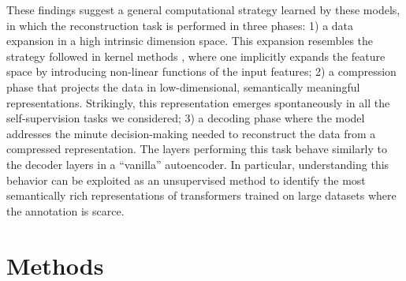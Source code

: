 \documentclass{article}
\begin{document}
These findings suggest a general computational strategy learned by these models, in which the reconstruction task is performed in three phases: 1) a data expansion in a high intrinsic dimension space. This expansion resembles the strategy followed in kernel methods \cite{scholkopf2018learning}, where one implicitly expands the feature space by introducing non-linear functions of the input features;  2) a compression phase that projects the data in low-dimensional, semantically meaningful representations. Strikingly, this representation emerges spontaneously in all the self-supervision tasks we considered; 3) a decoding phase where the model addresses the minute decision-making needed to reconstruct the data from a compressed representation. The layers performing this task behave similarly to the decoder layers in a ``vanilla'' autoencoder. In particular, understanding this behavior can be exploited as an unsupervised method to identify the most semantically rich representations of transformers trained on large datasets where the annotation is scarce.


\section{Methods}\label{sub:methods}
\end{document}
